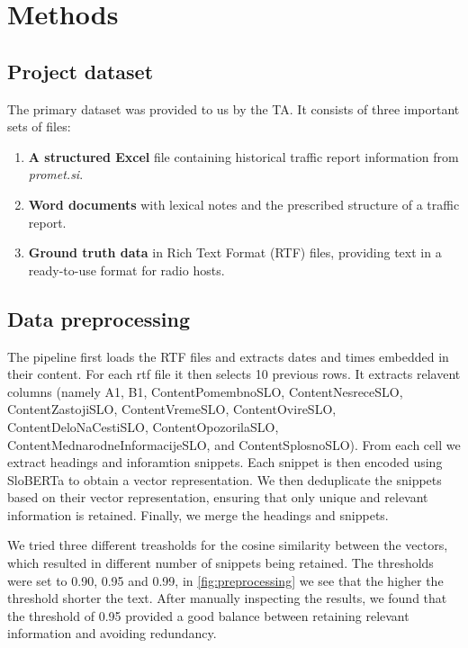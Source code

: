 \documentclass[fleqn,moreauthors,10pt]{ds_report}
\begin{document}
\section{Methods}

\subsection*{Project dataset}

The primary dataset was provided to us by the TA. It consists of three important sets of files:

\begin{enumerate}
    \item \textbf{A structured Excel }file containing historical traffic report information from \textit{promet.si}.
    \item \textbf{Word documents} with lexical notes and the prescribed structure of a traffic report.
    \item \textbf{Ground truth data} in Rich Text Format (RTF) files, providing text in a ready-to-use format for radio hosts.
\end{enumerate}


\subsection*{Data preprocessing}
The pipeline first loads the RTF files and extracts dates and times embedded in their content. For each rtf file it then selects 10 previous rows. It extracts relavent columns (namely A1, B1, ContentPomembnoSLO, ContentNesreceSLO, ContentZastojiSLO, ContentVremeSLO, ContentOvireSLO, ContentDeloNaCestiSLO, ContentOpozorilaSLO, ContentMednarodneInformacijeSLO, and ContentSplosnoSLO). From each cell we extract headings and inforamtion snippets. Each snippet is then encoded using SloBERTa \cite{SloBERTa} to obtain a vector representation. We then deduplicate the snippets based on their vector representation, ensuring that only unique and relevant information is retained. Finally, we merge the headings and snippets.

We tried three different treasholds for the cosine similarity between the vectors, which resulted in different number of snippets being retained. The thresholds were set to 0.90, 0.95 and 0.99, in \ref{fig:preprocessing} we see that the higher the threshold shorter the text. After manually inspecting the results, we found that the threshold of 0.95 provided a good balance between retaining relevant information and avoiding redundancy.
\end{document}
